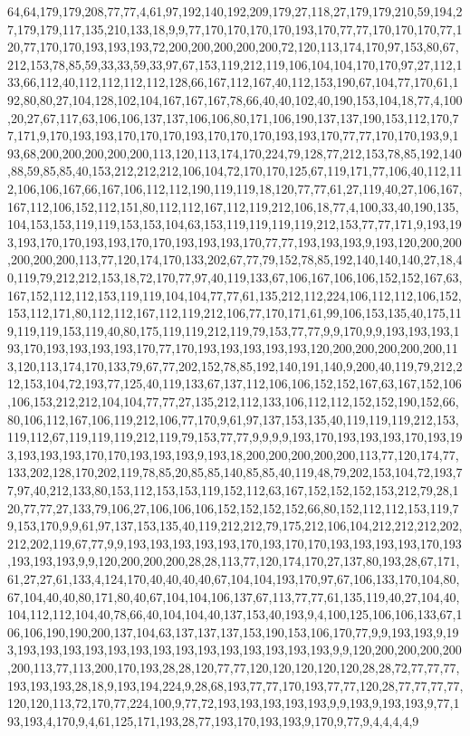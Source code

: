 64,64,179,179,208,77,77,4,61,97,192,140,192,209,179,27,118,27,179,179,210,59,194,27,179,179,117,135,210,133,18,9,9,77,170,170,170,170,193,170,77,77,170,170,170,77,120,77,170,170,193,193,193,72,200,200,200,200,200,72,120,113,174,170,97,153,80,67,212,153,78,85,59,33,33,59,33,97,67,153,119,212,119,106,104,104,170,170,97,27,112,133,66,112,40,112,112,112,112,128,66,167,112,167,40,112,153,190,67,104,77,170,61,192,80,80,27,104,128,102,104,167,167,167,78,66,40,40,102,40,190,153,104,18,77,4,100,20,27,67,117,63,106,106,137,137,106,106,80,171,106,190,137,137,190,153,112,170,77,171,9,170,193,193,170,170,170,193,170,170,170,193,193,170,77,77,170,170,193,9,193,68,200,200,200,200,200,113,120,113,174,170,224,79,128,77,212,153,78,85,192,140,88,59,85,85,40,153,212,212,212,106,104,72,170,170,125,67,119,171,77,106,40,112,112,106,106,167,66,167,106,112,112,190,119,119,18,120,77,77,61,27,119,40,27,106,167,167,112,106,152,112,151,80,112,112,167,112,119,212,106,18,77,4,100,33,40,190,135,104,153,153,119,119,153,153,104,63,153,119,119,119,119,212,153,77,77,171,9,193,193,193,170,170,193,193,170,170,193,193,193,170,77,77,193,193,193,9,193,120,200,200,200,200,200,113,77,120,174,170,133,202,67,77,79,152,78,85,192,140,140,140,27,18,40,119,79,212,212,153,18,72,170,77,97,40,119,133,67,106,167,106,106,152,152,167,63,167,152,112,112,153,119,119,104,104,77,77,61,135,212,112,224,106,112,112,106,152,153,112,171,80,112,112,167,112,119,212,106,77,170,171,61,99,106,153,135,40,175,119,119,119,153,119,40,80,175,119,119,212,119,79,153,77,77,9,9,170,9,9,193,193,193,193,170,193,193,193,193,170,77,170,193,193,193,193,193,120,200,200,200,200,200,113,120,113,174,170,133,79,67,77,202,152,78,85,192,140,191,140,9,200,40,119,79,212,212,153,104,72,193,77,125,40,119,133,67,137,112,106,106,152,152,167,63,167,152,106,106,153,212,212,104,104,77,77,27,135,212,112,133,106,112,112,152,152,190,152,66,80,106,112,167,106,119,212,106,77,170,9,61,97,137,153,135,40,119,119,119,212,153,119,112,67,119,119,119,212,119,79,153,77,77,9,9,9,9,193,170,193,193,193,170,193,193,193,193,193,170,170,193,193,193,9,193,18,200,200,200,200,200,113,77,120,174,77,133,202,128,170,202,119,78,85,20,85,85,140,85,85,40,119,48,79,202,153,104,72,193,77,97,40,212,133,80,153,112,153,153,119,152,112,63,167,152,152,152,153,212,79,28,120,77,77,27,133,79,106,27,106,106,106,152,152,152,152,66,80,152,112,112,153,119,79,153,170,9,9,61,97,137,153,135,40,119,212,212,79,175,212,106,104,212,212,212,202,212,202,119,67,77,9,9,193,193,193,193,193,170,193,170,170,193,193,193,193,170,193,193,193,193,9,9,120,200,200,200,28,28,113,77,120,174,170,27,137,80,193,28,67,171,61,27,27,61,133,4,124,170,40,40,40,40,67,104,104,193,170,97,67,106,133,170,104,80,67,104,40,40,80,171,80,40,67,104,104,106,137,67,113,77,77,61,135,119,40,27,104,40,104,112,112,104,40,78,66,40,104,104,40,137,153,40,193,9,4,100,125,106,106,133,67,106,106,190,190,200,137,104,63,137,137,137,153,190,153,106,170,77,9,9,193,193,9,193,193,193,193,193,193,193,193,193,193,193,193,193,193,193,9,9,120,200,200,200,200,200,113,77,113,200,170,193,28,28,120,77,77,120,120,120,120,120,28,28,72,77,77,77,193,193,193,28,18,9,193,194,224,9,28,68,193,77,77,170,193,77,77,120,28,77,77,77,77,120,120,113,72,170,77,224,100,9,77,72,193,193,193,193,193,9,9,193,9,193,193,9,77,193,193,4,170,9,4,61,125,171,193,28,77,193,170,193,193,9,170,9,77,9,4,4,4,4,9